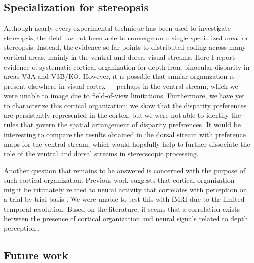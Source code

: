 \subsection*{Specialization for stereopsis}

Although nearly every experimental technique has been used to investigate stereopsis, the field has not been able to converge on a single specialized area for stereopsis. Instead, the evidence so far points to distributed coding across many cortical areas, mainly in the ventral and dorsal visual streams. Here I report evidence of systematic cortical organization for depth from binocular disparity in areas V3A and V3B/KO. However, it is possible that similar organization is present elsewhere in visual cortex --- perhaps in the ventral stream, which we were unable to image due to field-of-view limitations. Furthermore, we have yet to characterize this cortical organization: we show that the disparity preferences are persistently represented in the cortex, but we were not able to identify the rules that govern the spatial arrangement of disparity preferences. It would be interesting to compare the results obtained in the dorsal stream with preference maps for the ventral stream, which would hopefully help to further dissociate the role of the ventral and dorsal streams in stereoscopic processing.

Another question that remains to be answered is concerned with the purpose of such cortical organization. Previous work suggests that cortical organization might be intimately related to neural activity that correlates with perception on a trial-by-trial basis \cite{Nienborg:2014fu}. We were unable to test this with fMRI due to the limited temporal resolution. Based on the literature, it seems that a correlation exists between the presence of cortical organization and neural signals related to depth perception \cite{Clery:2015lh,Nienborg:2014fu,Nienborg:2007ly,Nienborg:2006qo,Shiozaki:2012ys,Uka:2004mg,DeAngelis:1998df}.


\subsection*{Future work}

